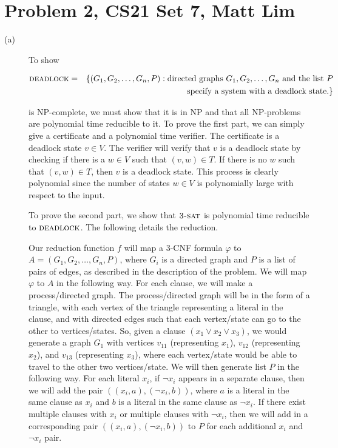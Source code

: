 \documentclass{article}
\begin{document}
\section*{Problem 2, CS21 Set 7, Matt Lim}
\begin{description}
    \item[(a)]
        To show

        \begin{eqnarray*}
            \mbox{{\sc deadlock}} &=& \{(G_1, G_2, \ldots, G_n, P)  :
                \mbox{directed graphs $G_1, G_2, \ldots, G_n$ and the list $P$} \\
                & & \mbox{specify a system with a deadlock state.}\}
            \end{eqnarray*}

        is NP-complete, we must show that it is in NP and that all NP-problems
        are polynomial time reducible to it. To prove the first part, we can
        simply give a certificate and a polynomial time verifier. The
        certificate is a deadlock state $v \in V$.
        The verifier will verify that $v$ is a deadlock state by
        checking if there is a $w \in V$ such that
        $(v, w) \in T$. If there is no $w$ such that $(v,w) \in T$,
        then $v$ is a deadlock state. This process is clearly polynomial
        since the number of states $w \in V$ is polynomially large with respect
        to the input.

        To prove the second part, we show that $\mbox{\sc 3-sat}$ is polynomial
        time reducible to $\mbox{\sc deadlock}$. The following details the
        reduction.

        Our reduction function $f$ will map a 3-CNF formula $\varphi$ to
        $A = (G_1, G_2, \dots, G_n, P)$, where $G_i$ is a directed graph and
        $P$ is a list of pairs of edges, as described in the description of the
        problem. We will map $\varphi$ to $A$ in the following way. For each
        clause, we will make a process/directed graph. The process/directed
        graph will be in the form of a triangle, with each vertex of the
        triangle representing a literal in the clause, and with directed edges
        such that each vertex/state can go to the other to vertices/states.
        So, given a clause $(x_1 \vee x_2 \vee x_3)$, we would generate
        a graph $G_1$ with vertices $v_{11}$ (representing $x_1$), $v_{12}$
        (representing $x_2$), and $v_{13}$ (representing $x_3$), where each
        vertex/state would be able to travel to the other two vertices/state.
        We will then generate list $P$ in the following way. For each literal
        $x_i$, if $\neg x_i$ appears in a separate clause, then we will add
        the pair $((x_i, a), (\neg x_i, b))$, where $a$ is a literal in the same
        clause as $x_i$ and $b$ is a literal in the same clause as $\neg x_i$.
        If there exist multiple clauses with $x_i$ or multiple clauses with
        $\neg x_i$, then we will add in a corresponding pair $((x_i, a), (\neg x_i, b))$
        to $P$ for each additional $x_i$ and $\neg x_i$ pair.


\end{description}
\end{document}
